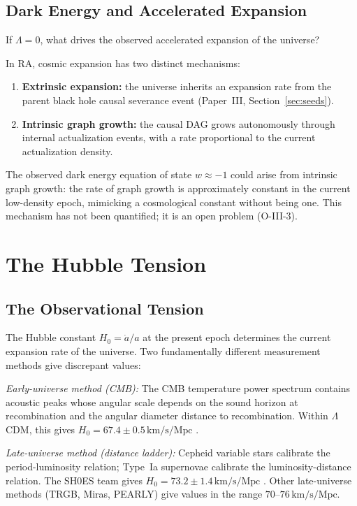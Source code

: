 \documentclass[12pt,a4paper]{article}
\begin{document}
\subsection{Dark Energy and Accelerated Expansion}

If $\Lambda=0$, what drives the observed accelerated expansion of the universe?

In RA, cosmic expansion has two distinct mechanisms:
\begin{enumerate}
  \item \textbf{Extrinsic expansion:} the universe inherits an expansion rate from the parent black hole causal severance event (Paper~III, Section~\ref{sec:seeds}).
  \item \textbf{Intrinsic graph growth:} the causal DAG grows autonomously through internal actualization events, with a rate proportional to the current actualization density.
\end{enumerate}
The observed dark energy equation of state $w\approx-1$ could arise from intrinsic graph growth: the rate of graph growth is approximately constant in the current low-density epoch, mimicking a cosmological constant without being one.  This mechanism has not been quantified; it is an open problem (O-III-3).

\section{The Hubble Tension}\label{sec:hubble}

\subsection{The Observational Tension}

The Hubble constant $H_0=\dot{a}/a$ at the present epoch determines the current expansion rate of the universe.  Two fundamentally different measurement methods give discrepant values:

\textit{Early-universe method (CMB):} The CMB temperature power spectrum contains acoustic peaks whose angular scale depends on the sound horizon at recombination and the angular diameter distance to recombination.  Within $\Lambda$CDM, this gives $H_0=67.4\pm0.5\,\mathrm{km/s/Mpc}$ \cite{Planck2020}.

\textit{Late-universe method (distance ladder):} Cepheid variable stars calibrate the period-luminosity relation; Type~Ia supernovae calibrate the luminosity-distance relation.  The SH0ES team gives $H_0=73.2\pm1.4\,\mathrm{km/s/Mpc}$ \cite{Riess2022}.  Other late-universe methods (TRGB, Miras, PEARLY) give values in the range $70$--$76\,\mathrm{km/s/Mpc}$.
\end{document}
